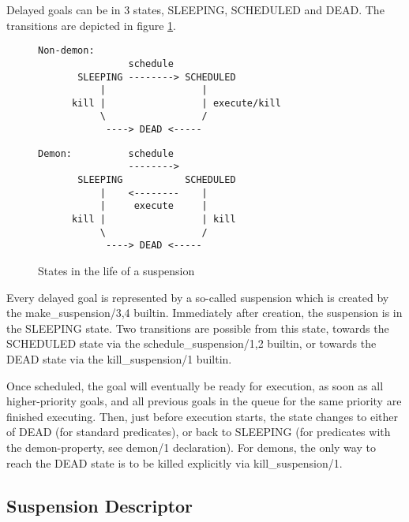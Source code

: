 Delayed goals can be in 3 states, SLEEPING, SCHEDULED  and DEAD.
The transitions are depicted in figure \ref{figsuspstates}.
\begin{figure}
\hfill
\begin{minipage}[t]{.45\textwidth}
\begin{tiny}
\begin{verbatim}
Non-demon:
                schedule
       SLEEPING --------> SCHEDULED
           |                 |
      kill |                 | execute/kill
           \                 /
            ----> DEAD <-----
\end{verbatim}
\end{tiny}
\end{minipage}
\hfill
\begin{minipage}[t]{.45\textwidth}
\begin{tiny}
\begin{verbatim}
Demon:          schedule
                -------->
       SLEEPING           SCHEDULED
           |    <--------    |
           |     execute     |
      kill |                 | kill
           \                 /
            ----> DEAD <-----
\end{verbatim}
\end{tiny}
\end{minipage}
\hfill
\caption{States in the life of a suspension}
\label{figsuspstates}
\end{figure}
Every delayed goal is represented by a so-called suspension
which is created by the make_suspension/3,4 builtin.
Immediately after creation, the suspension is in the SLEEPING state.
Two transitions are possible from this state, towards the SCHEDULED state
via the schedule_suspension/1,2 builtin, or towards the DEAD state via
the kill_suspension/1 builtin.

Once scheduled, the goal will eventually be ready for execution, as
soon as all higher-priority goals, and all previous goals in the queue for
the same priority are finished executing.  Then, just before execution starts,
the state changes to either of DEAD (for standard predicates), or back
to SLEEPING (for predicates with the demon-property, see demon/1 declaration).
For demons, the only way to reach the DEAD state is to be killed explicitly
via kill_suspension/1.


\subsection{Suspension Descriptor}

